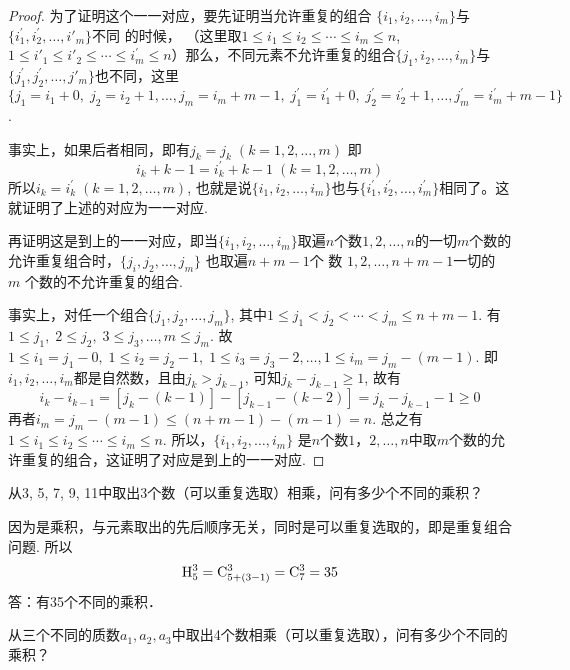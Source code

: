 \begin{proof}
    
为了证明这个一一对应，要先证明当允许重复的组合
$\{i_1,i_2,\ldots,i_m\}$与$\{i_1^{\prime},i_2^{\prime},\ldots,i'_m\}$不同 的时候，
（这里取$1\le i_1\le i_2\le\cdots\le i_m\le n$, $1\le i'_1\le i'_2\le\cdots\le i^{\prime}_m\le n$）那么，不同元素不允许重复的组合$\{j_1,i_2,\ldots, i_m\}$与$\{j_1^{\prime},j_2^{\prime},\ldots,j'_m\}$也不同，这里$\{j_1=i_1+0,\; j_2=i_{2}+1,\ldots,j_{m}=i_{m}+m-1,\; j_{1}^{\prime}=i_{1}^{\prime}+0,\; j_{2}^{\prime}=i_{2}^{\prime}+1,\ldots, j_m^{\prime}=i_m^{\prime}+m-1\}$.

事实上，如果后者相同，即有$j_{k}= j_{k}\; (k= 1, 2, \ldots, m)$ 即
$$i_k+k-1=i_k^{\prime}+k-1\; (k=1,2,\ldots,m)$$ 
所以$i_k= i_k^{\prime }\; ( k= 1, 2, \ldots , m)$, 也就是说$\{i_1, i_2,\ldots,i_m\}$也与$\{i_1^{\prime},i_2^{\prime},\ldots,i_m^{\prime}\}$相同了。这就证明了上述的对应为一一对应.

再证明这是到上的一一对应，即当$\{i_1,i_2,\ldots,i_m\}$取遍$n$个数$1,2,\ldots,n$的一切$m$个数的允许重复组合时，$\{j_i, j_2,\ldots,j_m\}$ 也取遍$n+m-1$个 数 $1,2,\ldots ,n+m-1$一切的 $m$ 个数的不允许重复的组合.

事实上，对任一个组合$\{j_1,j_2,\ldots,j_m\}$, 其中$1\le j_{1}<j_{2}<\cdots<j_{m}\le n+m-1$. 有$1\leq j_{1},\; 2\le j_{2},\; 3\le j_{3},\ldots, m\le j_{m}$. 故$1\le i_1=j_1-0,\; 1\le i_2=j_2-1,\; 1\le i_3=j_3-2,\ldots, 1\leq i_m=j_m-(m-1)$. 即$i_1,i_2,\ldots,i_m$都是自然数，且由$j_{k}>j_{k-1}$, 可知$j_k-j_{k-1}\ge 1$, 故有
\[i_k-i_{k-1}=[j_k-(k-1)]-[j_{k-1}-(k-2)]=j_k-j_{k-1}-1\ge 0\]
再者$i_{m}=j_{m}-(m-1)\le (n+m-1)-(m-1)=n$. 总之有$1\le i_1\le i_2\le \cdots \le i_m\le n$. 所以，$\{i_1,i_2,\ldots,i_m\}$ 是$n$个数$1，2,\ldots,n$中取$m$个数的允许重复的组合，这证明了对应是到上的一一对应.

\end{proof}


\begin{example}
  从3, 5, 7, 9, 11中取出3个数（可以重复选取）相乘，问有多少个不同的乘积？  
\end{example}

\begin{solution}
    因为是乘积，与元素取出的先后顺序无关，同时是可以重复选取的，即是重复组合问题. 所以
\[{\rm H}^3_5={\rm C}^{3}_{5+(3-1)}={\rm C}^{3}_{7}=35\]
答：有35个不同的乘积．
\end{solution}

\begin{example}
    从三个不同的质数$a_1,a_2,a_3$中取出4个数相乘（可以重复选取），问有多少个不同的乘积？
\end{example}

